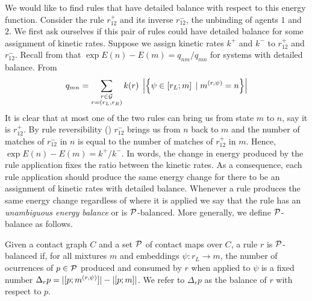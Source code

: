 We would like to find rules that have detailed balance
with respect to this energy function.
Consider the rule $r^+_{12}$ and its inverse $r^-_{12}$,
the unbinding of agents $1$ and $2$.
We first ask ourselves if this pair of rules
could have detailed balance
for some assignment of kinetic rates.
Suppose we assign kinetic rates $k^+$ and $k^-$
to $r^+_{12}$ and $r^-_{12}$.
Recall from  that $\exp{E(n)-E(m)} = q_{nm}/q_{mn}$
for systems with detailed balance.
From 
\[ q_{mn} = \sum_{\substack{r \in \mathcal{G}\\r = \left(r_L,r_R\right)}}
   k(r) \; \left\lvert \left\{ \psi \in \left[r_L;m\right] \; | \; m^{(r,\psi)} = n \right\} \right\rvert
\]
It is clear that at most one of the two rules
can bring us from state $m$ to $n$, say it is $r^+_{12}$.
By rule reversibility ()
$r^-_{12}$ brings us from $n$ back to $m$
and the number of matches of $r^-_{12}$ in $n$
is equal to the number of matches of $r^+_{12}$ in $m$.
Hence, $\exp{E(n)-E(m)} = k^+/k^-$.
In words, the change in energy produced by the rule application
fixes the ratio between the kinetic rates.
As a consequence,
each rule application should produce the same energy change
for there to be an assignment of kinetic rates with detailed balance.
Whenever a rule produces the same energy change
regardless of where it is applied
we say that the rule has an \emph{unambiguous energy balance}
or is $\mathcal{P}$-balanced.
More generally, we define $\mathcal{P}$-balance as follows.

\begin{definition}
  Given a contact graph $C$
  and a set $\mathcal{P}$ of contact maps over $C$,
  a rule $r$ is $\mathcal{P}$-balanced
  if, for all mixtures $m$ and embeddings $\psi: r_L \to m$,
  the number of ocurrences of $p \in \mathcal{P}$
  produced and consumed by $r$ when applied to $\psi$
  is a fixed number
  $\Delta_r p = |[p;m^{(r,\psi)}]| - \left\lvert \left[p;m\right] \right\rvert$.
  We refer to $\Delta_r p$ as the balance of $r$ with respect to $p$.
\end{definition}

